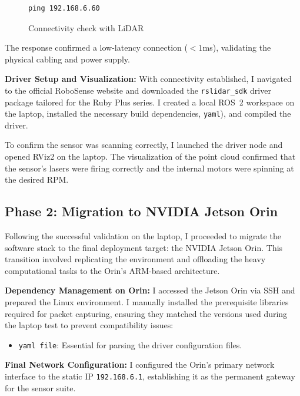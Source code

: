 \documentclass[12pt,a4paper]{report}
\begin{document}
\begin{figure}[ht!]
    \centering
    \begin{verbatim}
ping 192.168.6.60
    \end{verbatim}
    \caption{Connectivity check with LiDAR}
    \label{fig:ping_check}
\end{figure}

The response confirmed a low-latency connection ($< 1$ms), validating the physical cabling and power supply.

\textbf{Driver Setup and Visualization:} With connectivity established, I navigated to the official RoboSense website and downloaded the \texttt{rslidar\_sdk} driver package tailored for the Ruby Plus series. I created a local ROS~2 workspace on the laptop, installed the necessary build dependencies, \texttt{yaml}), and compiled the driver.

To confirm the sensor was scanning correctly, I launched the driver node and opened RViz2 on the laptop. The visualization of the point cloud confirmed that the sensor’s lasers were firing correctly and the internal motors were spinning at the desired RPM.

\subsection{Phase 2: Migration to NVIDIA Jetson Orin}
Following the successful validation on the laptop, I proceeded to migrate the software stack to the final deployment target: the NVIDIA Jetson Orin. This transition involved replicating the environment and offloading the heavy computational tasks to the Orin’s ARM-based architecture.

\textbf{Dependency Management on Orin:} I accessed the Jetson Orin via SSH and prepared the Linux environment. I manually installed the prerequisite libraries required for packet capturing, ensuring they matched the versions used during the laptop test to prevent compatibility issues:

\begin{itemize}
    
    \item \texttt{yaml file}: Essential for parsing the driver configuration files.
\end{itemize}

\textbf{Final Network Configuration:} I configured the Orin’s primary network interface to the static IP \texttt{192.168.6.1}, establishing it as the permanent gateway for the sensor suite.
\end{document}
